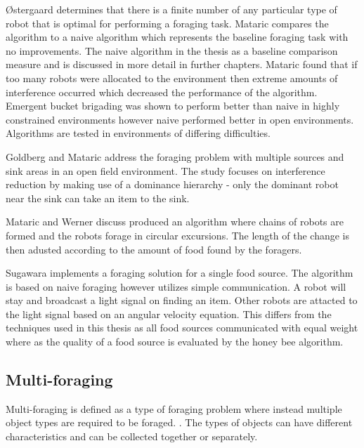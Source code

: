 \O stergaard \cite{ostergaard2001emergent} determines that there is a finite number of any particular type of robot that is optimal for performing a foraging task. Mataric compares the algorithm to a naive algorithm which represents the baseline foraging task with no improvements. The naive algorithm in the thesis as a baseline comparison measure and is discussed in more detail in further chapters. Mataric found that if too many robots were allocated to the environment then extreme amounts of interference occurred which decreased the performance of the algorithm. Emergent bucket brigading was shown to perform better than naive in highly constrained environments however naive performed better in open environments. Algorithms are tested in environments of differing difficulties. %


Goldberg and Mataric \cite{Goldberg01designand} address the foraging problem with multiple sources and sink areas in an open field environment. The study focuses on interference reduction by making use of a dominance hierarchy - only the dominant robot near the sink can take an item to the sink. %

Mataric \cite{werger1996robotic} and Werner discuss produced an algorithm where chains of robots are formed and the robots forage in circular excursions. The length of the change is then adusted according to the amount of food found by the foragers. %
 
Sugawara \cite{sugawara2002swarming} implements a foraging solution for a single food source. The algorithm is based on naive foraging however utilizes simple communication. A robot will stay and broadcast a light signal on finding an item. Other robots are attacted to the light signal based on an angular velocity equation. This differs from the techniques used in this thesis as all food sources communicated with equal weight where as the quality of a food source is evaluated by the honey bee algorithm.

\subsection{Multi-foraging}
Multi-foraging is defined as a type of foraging problem where instead  multiple object types are required to be foraged. \cite{Balch99rewardand}. The types of objects can have different characteristics and can be collected together or separately.

